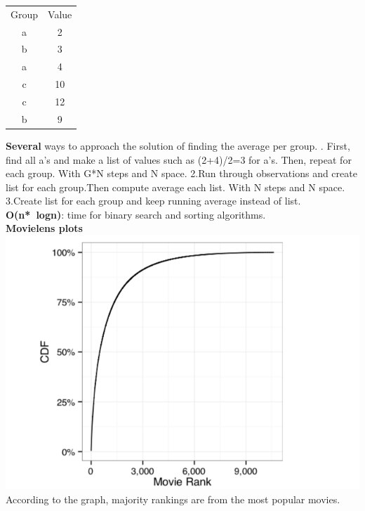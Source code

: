 \begin{tabular}{cc}
Group & Value \\
a & 2 \\
b & 3 \\
a & 4 \\
c & 10 \\
c & 12 \\
b & 9
\end{tabular}

\noindent\textbf{Several} ways to approach the solution of finding the average per group.
. First, find all a's and make a list of values such as (2+4)/2=3 for a's. Then, repeat for each group. With G*N steps and N space.
\newline2.Run through observations and create list for each group.Then compute average each list. With N steps and N space.
\newline3.Create list for each group and keep running average instead of list.
\newline\textbf{O(n*\ logn)}: time for binary search and sorting algorithms.\\
\begingroup \centering \textbf{Movielens plots}
\includegraphics{figures/wee}\endgroup 
\newline According to the graph, majority rankings are from the most popular movies.

